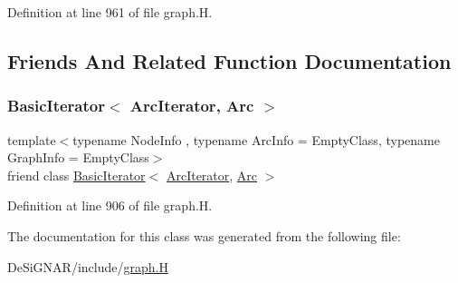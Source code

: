 Definition at line 961 of file graph.\+H.



\subsection{Friends And Related Function Documentation}
\mbox{\label{class_designar_1_1_graph_1_1_arc_iterator_a530ad7c7218fa9b74a5cce004d0e3a1c}} 
\subsubsection{\texorpdfstring{Basic\+Iterator$<$ Arc\+Iterator, Arc $>$}{BasicIterator< ArcIterator, Arc >}}
{\footnotesize\ttfamily template$<$typename Node\+Info , typename Arc\+Info  = Empty\+Class, typename Graph\+Info  = Empty\+Class$>$ \\
friend class \hyperlink{class_designar_1_1_basic_iterator}{Basic\+Iterator}$<$ \hyperlink{class_designar_1_1_graph_1_1_arc_iterator}{Arc\+Iterator}, \hyperlink{class_designar_1_1_graph_a74c730ef4ce2d20f998d72bd25c2b5bf}{Arc} $>$\hspace{0.3cm}{\ttfamily [friend]}}



Definition at line 906 of file graph.\+H.



The documentation for this class was generated from the following file\+:\begin{DoxyCompactItemize}
\item 
De\+Si\+G\+N\+A\+R/include/\hyperlink{graph_8_h}{graph.\+H}\end{DoxyCompactItemize}
